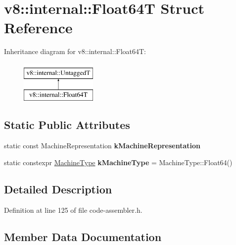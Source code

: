 \hypertarget{structv8_1_1internal_1_1Float64T}{}\section{v8\+:\+:internal\+:\+:Float64T Struct Reference}
\label{structv8_1_1internal_1_1Float64T}
Inheritance diagram for v8\+:\+:internal\+:\+:Float64T\+:\begin{figure}[H]
\begin{center}
\leavevmode
\includegraphics[height=2.000000cm]{structv8_1_1internal_1_1Float64T}
\end{center}
\end{figure}
\subsection*{Static Public Attributes}
\begin{DoxyCompactItemize}
\item 
static const Machine\+Representation {\bfseries k\+Machine\+Representation}
\item 
\mbox{\label{structv8_1_1internal_1_1Float64T_a9a077784daefb99dc63b77efefbede2a}} 
static constexpr \mbox{\hyperlink{classv8_1_1internal_1_1MachineType}{Machine\+Type}} {\bfseries k\+Machine\+Type} = Machine\+Type\+::\+Float64()
\end{DoxyCompactItemize}


\subsection{Detailed Description}


Definition at line 125 of file code-\/assembler.\+h.



\subsection{Member Data Documentation}
\mbox{\label{structv8_1_1internal_1_1Float64T_a4e87f959b7947bec295c545fd3a468f9}} 
